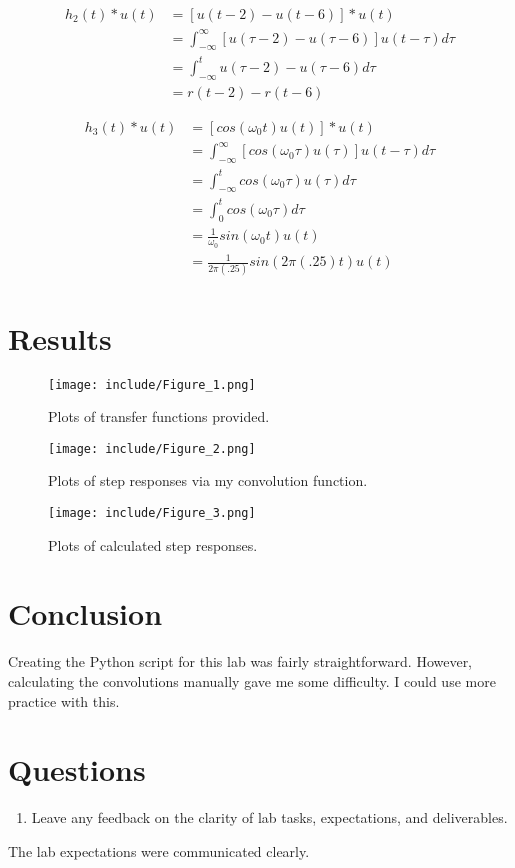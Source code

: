 \documentclass[12pt]{article}
\begin{document}
\begin{align*}
h_2(t)*u(t) &= [u(t-2)-u(t-6)]*u(t) \\
 &= \int_{-\infty}^{\infty} [u(\tau-2)-u(\tau-6)]u(t-\tau)d\tau \\
 &= \int_{-\infty}^{t} u(\tau-2)-u(\tau-6)d\tau \\
 &= r(t-2)-r(t-6)
\end{align*}

\begin{align*}
h_3(t)*u(t) &= [cos(\omega_0t)u(t)]*u(t) \\
 &= \int_{-\infty}^{\infty} [cos(\omega_0\tau)u(\tau)] u(t-\tau)d\tau \\
 &= \int_{-\infty}^{t} cos(\omega_0\tau)u(\tau) d\tau \\
 &= \int_{0}^{t} cos(\omega_0\tau) d\tau \\
 &= \frac{1}{\omega_0}sin(\omega_0t)u(t) \\
 &= \frac{1}{2\pi(.25)}sin(2\pi(.25)t)u(t)
\end{align*}

\newpage
\section{Results}
    \begin{figure}[hbt!]
        \centering
        \texttt{[image: include/Figure\_1.png]}
        \caption{Plots of transfer functions provided.}
    \end{figure}
    
    \begin{figure}
        \centering
        \texttt{[image: include/Figure\_2.png]}
        \caption{Plots of step responses via my convolution function.}
    \end{figure}
    
    \begin{figure}
        \centering
        \texttt{[image: include/Figure\_3.png]}
        \caption{Plots of calculated step responses.}
    \end{figure}
    
    
\newpage
\section{Conclusion}
    \par Creating the Python script for this lab was fairly straightforward. However, calculating the convolutions manually gave me some difficulty. I could use more practice with this.
    
\newpage
\section*{Questions}

\begin{enumerate}
    \item Leave any feedback on the clarity of lab tasks, expectations, and deliverables.
\end{enumerate}
    \par The lab expectations were communicated clearly.
    
\end{document}
